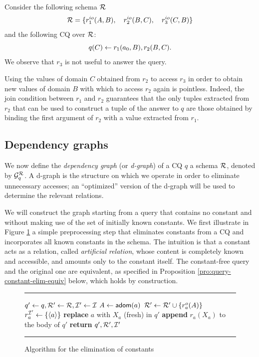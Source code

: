 \begin{example}
    Consider the following schema $\mathcal{R}$
    \[
        \mathcal{R} = \{ r_1^{io}(A,B), \quad
                r_2^{io}(B,C), \quad
                r_3^{io}(C,B) \}
    \]
    and the following CQ over $\mathcal{R}$:
    \[
        q(C) \leftarrow r_1(a_0,B), r_2(B,C).
    \]
    We observe that $r_{3}$ is not useful to answer the query.

    Using the values of domain $C$ obtained from $r_2$ to access $r_3$ in order to obtain new values of domain $B$ with which to access $r_2$ again is pointless. Indeed, the join condition between $r_1$ and $r_2$ guarantees that the only tuples extracted from $r_2$ that can be used to construct a tuple of the answer to $q$ are those obtained by binding the first argument of $r_2$ with a value extracted from $r_1$.

\end{example}

\subsection{Dependency graphs}

We now define the \emph{dependency graph} (or \emph{d-graph}) of a CQ $q$ \wrt a schema $\mathcal{R}$, denoted by $\mathcal{G}_q^{\mathcal{R}}$. A d-graph is the structure on which we operate in order to eliminate unnecessary accesses; an ``optimized'' version of the d-graph will be used to determine the relevant relations.

We will construct the graph starting from a query that contains no constant and without making use of the set of initially known constants.
We first illustrate in Figure \ref{fig:algo-constants} a simple preprocessing step that eliminates constants from a CQ and incorporates all known constants in the schema.
The intuition is that a constant acts as a relation, called \emph{artificial relation}, whose content is completely known and accessible, and amounts only to the constant itself.
The constant-free query and the original one are equivalent, as specified in Proposition \ref{pro:query-constant-elim-equiv} below, which holds by construction.

\begin{figure}[t]\label{fig:algo-constants}
\rule{\textwidth}{0.075mm}
\begin{algorithmic}
        \Let $q' \gets q, \mathcal{R}' \gets \mathcal{R}, \mathcal{I}' \gets \mathcal{I}$
            \Let $A \gets \textsf{adom}(a)$
            \Let $\mathcal{R}' \gets \mathcal{R}' \cup \{ r_a^{o}(A) \}$
            \Let $r_a^{\mathcal{I}'} \gets \{ \langle a\rangle \}$
                \State \textbf{replace} $a$ with $X_a$ (fresh) in $q'$
                \State \textbf{append} $r_a(X_a)$ to the body of $q'$
            \EndIf
        \EndFor
        \State \textbf{return} $q',\mathcal{R}',\mathcal{I}'$
    \EndFunction
\end{algorithmic}
\rule{\textwidth}{0.075mm}
\caption{Algorithm for the elimination of constants}
\end{figure}

